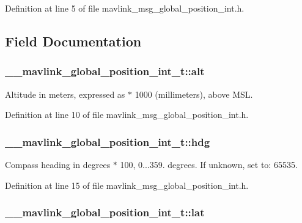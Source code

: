 Definition at line 5 of file mavlink\-\_\-msg\-\_\-global\-\_\-position\-\_\-int.\-h.



\subsection{Field Documentation}
\hypertarget{struct____mavlink__global__position__int__t_a1d9e69a26dc214bd624c9474ca3d79f4}{
\subsubsection[{alt}]{ \-\_\-\-\_\-mavlink\-\_\-global\-\_\-position\-\_\-int\-\_\-t\-::alt}}\label{struct____mavlink__global__position__int__t_a1d9e69a26dc214bd624c9474ca3d79f4}


Altitude in meters, expressed as $\ast$ 1000 (millimeters), above M\-S\-L. 



Definition at line 10 of file mavlink\-\_\-msg\-\_\-global\-\_\-position\-\_\-int.\-h.

\hypertarget{struct____mavlink__global__position__int__t_a60f7c02018c444cdffb6121dee854e19}{
\subsubsection[{hdg}]{ \-\_\-\-\_\-mavlink\-\_\-global\-\_\-position\-\_\-int\-\_\-t\-::hdg}}\label{struct____mavlink__global__position__int__t_a60f7c02018c444cdffb6121dee854e19}


Compass heading in degrees $\ast$ 100, 0...359. degrees. If unknown, set to\-: 65535. 



Definition at line 15 of file mavlink\-\_\-msg\-\_\-global\-\_\-position\-\_\-int.\-h.

\hypertarget{struct____mavlink__global__position__int__t_a949653d08153161bb49b94794169a70f}{
\subsubsection[{lat}]{ \-\_\-\-\_\-mavlink\-\_\-global\-\_\-position\-\_\-int\-\_\-t\-::lat}}\label{struct____mavlink__global__position__int__t_a949653d08153161bb49b94794169a70f}


